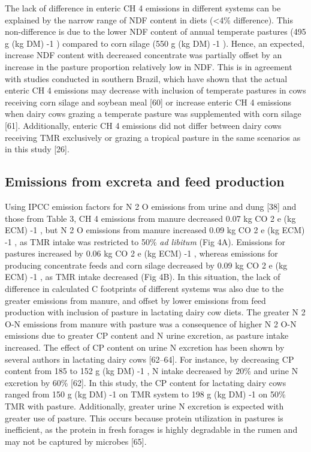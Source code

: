 \documentclass[11pt,a4paper]{article}
\begin{document}
The lack of difference in enteric CH 4 emissions in different systems can be explained by the narrow range of NDF content in diets (<4\% difference). This non-difference is due to the lower NDF content of annual temperate pastures (495 g (kg DM) -1 ) compared to corn silage (550 g (kg DM) -1 ). Hence, an expected, increase NDF content with decreased concentrate was partially offset by an increase in the pasture proportion relatively low in NDF. This is in agreement with studies conducted in southern Brazil, which have shown that the actual enteric CH 4 emissions may decrease with inclusion of temperate pastures in cows receiving corn silage and soybean meal [60] or increase enteric CH 4 emissions when dairy cows grazing a temperate pasture was supplemented with corn silage [61]. Additionally, enteric CH 4 emissions did not differ between dairy cows receiving TMR exclusively or grazing a tropical pasture in the same scenarios as in this study [26].

\subsection{Emissions from excreta and feed production}

Using IPCC emission factors for N 2 O emissions from urine and dung [38] and those from Table 3, CH 4 emissions from manure decreased 0.07 kg CO 2 e (kg ECM) -1 , but N 2 O emissions from manure increased 0.09 kg CO 2 e (kg ECM) -1 , as TMR intake was restricted to 50\% \textit{ad libitum} (Fig 4A). Emissions for pastures increased by 0.06 kg CO 2 e (kg ECM) -1 , whereas emissions for producing concentrate feeds and corn silage decreased by 0.09 kg CO 2 e (kg ECM) -1 , as TMR intake decreased (Fig 4B). In this situation, the lack of difference in calculated C footprints of different systems was also due to the greater emissions from manure, and offset by lower emissions from feed production with inclusion of pasture in lactating dairy cow diets. The greater N 2 O-N emissions from manure with pasture was a consequence of higher N 2 O-N emissions due to greater CP content and N urine excretion, as pasture intake increased. The effect of CP content on urine N excretion has been shown by several authors in lactating dairy cows [62–64]. For instance, by decreasing CP content from 185 to 152 g (kg DM) -1 , N intake decreased by 20\% and urine N excretion by 60\% [62]. In this study, the CP content for lactating dairy cows ranged from 150 g (kg DM) -1 on TMR system to 198 g (kg DM) -1 on 50\% TMR with pasture. Additionally, greater urine N excretion is expected with greater use of pasture. This occurs because protein utilization in pastures is inefficient, as the protein in fresh forages is highly degradable in the rumen and may not be captured by microbes [65].
\end{document}
